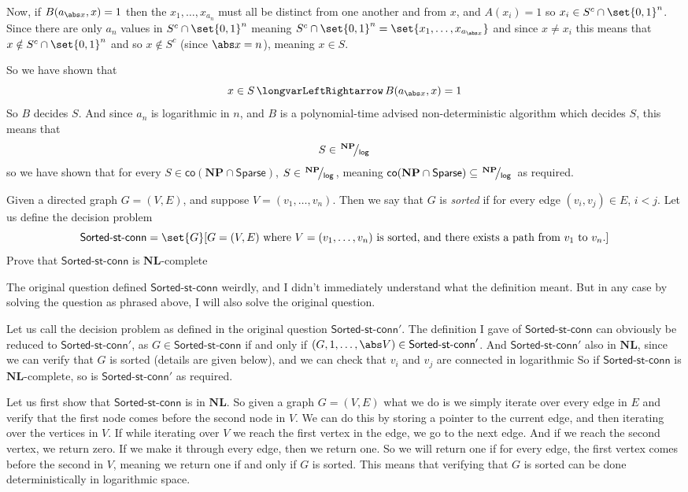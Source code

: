 \documentclass[10pt]{article}
\def\iff{\,\longvarLeftRightarrow\,}
\def\sparse{\mathsf{Sparse}}
\def\NP{\mathbf{NP}}
\def\co{\mathsf{co}}
\def\NL{\mathbf{NL}}
\begin{document}
Now, if $B(a_{\abs x},x)=1$ then the $x_1,\dots,x_{a_n}$ must all be distinct from one another and from $x$, and $A(x_i)=1$ so $x_i\in S^c\cap\set{0,1}^n$.
Since there are only $a_n$ values in $S^c\cap\set{0,1}^n$ meaning $S^c\cap\set{0,1}^n=\set{x_1,\dots,x_{a_{\abs x}}}$ and since $x\neq x_i$ this means that $x\notin S^c\cap\set{0,1}^n$ and so
$x\notin S^c$ (since $\abs x=n$), meaning $x\in S$.

So we have shown that
\[ x\in S \iff B(a_{\abs x},x) = 1 \]
So $B$ decides $S$.
And since $a_n$ is logarithmic in $n$, and $B$ is a polynomial-time advised non-deterministic algorithm which decides $S$, this means that
\[ S\in\NPlog \]
so we have shown that for every $S\in\co(\NP\cap\sparse)$, $S\in\NPlog$, meaning $\co(\NP\cap\sparse)\subseteq\NPlog$ as required.

\def\sortstconn{\textsf{Sorted-st-conn}}
\begin{exercise*}

    Given a directed graph $G=(V,E)$, and suppose $V=(v_1,\dots,v_n)$.
    Then we say that $G$ is \emph{sorted} if for every edge $(v_i,v_j)\in E$, $i<j$.
    Let us define the decision problem
    \[ \sortstconn = \set{G}[\text{$G=(V,E)$ where $V=(v_1,\dots,v_n)$ is sorted, and there exists a path from $v_1$ to $v_n$.}] \]
    Prove that $\sortstconn$ is $\NL$-complete

\end{exercise*}

\begin{note}

    The original question defined $\sortstconn$ weirdly, and I didn't immediately understand what the definition meant.
    But in any case by solving the question as phrased above, I will also solve the original question.

    Let us call the decision problem as defined in the original question $\sortstconn'$.
    The definition I gave of $\sortstconn$ can obviously be reduced to $\sortstconn'$, as $G\in\sortstconn$ if and only if $(G,1,\dots,\abs V)\in\sortstconn'$.
    And $\sortstconn'$ also in $\NL$, since we can verify that $G$ is sorted (details are given below), and we can check that $v_i$ and $v_j$ are connected in logarithmic
    So if $\sortstconn$ is $\NL$-complete, so is $\sortstconn'$ as required.

\end{note}

Let us first show that $\sortstconn$ is in $\NL$.
So given a graph $G=(V,E)$ what we do is we simply iterate over every edge in $E$ and verify that the first node comes before the second node in $V$.
We can do this by storing a pointer to the current edge, and then iterating over the vertices in $V$.
If while iterating over $V$ we reach the first vertex in the edge, we go to the next edge.
And if we reach the second vertex, we return zero.
If we make it through every edge, then we return one.
So we will return one if for every edge, the first vertex comes before the second in $V$, meaning we return one if and only if $G$ is sorted.
This means that verifying that $G$ is sorted can be done deterministically in logarithmic space.
\end{document}
